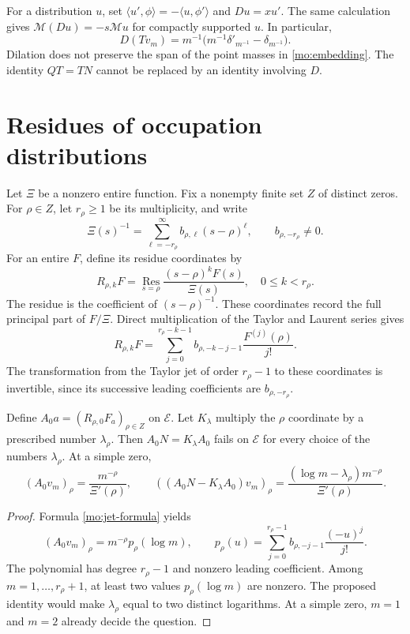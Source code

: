 For a distribution $u$, set $\langle u',\phi\rangle=-\langle
u,\phi'\rangle$ and $Du=xu'$. The same calculation gives
$\mathcal M(Du)=-s\mathcal Mu$ for compactly supported $u$.
In particular,
\[
 D(Tv_m)=m^{-1}\bigl(m^{-1}\delta'_{m^{-1}}-\delta_{m^{-1}}\bigr).
\]
Dilation does not preserve the span of the point masses in
\eqref{mo:embedding}. The identity $QT=TN$ cannot be replaced by
an identity involving $D$.

\section{Residues of occupation distributions}

Let $\Xi$ be a nonzero entire function. Fix a nonempty finite set
$Z$ of distinct zeros. For $\rho\in Z$, let $r_\rho\geq1$ be its
multiplicity, and write
\[
 \Xi(s)^{-1}=
 \sum_{\ell=-r_\rho}^{\infty}b_{\rho,\ell}(s-\rho)^\ell,
 \qquad b_{\rho,-r_\rho}\ne0.
\]
For an entire $F$, define its residue coordinates by
\begin{equation}
 R_{\rho,k}F=\operatorname*{Res}_{s=\rho}
 \frac{(s-\rho)^kF(s)}{\Xi(s)},
 \quad 0\leq k<r_\rho.
 \label{mo:jets}
\end{equation}
The residue is the coefficient of $(s-\rho)^{-1}$. These coordinates
record the full principal part of $F/\Xi$. Direct multiplication
of the Taylor and Laurent series gives
\begin{equation}
 R_{\rho,k}F=
 \sum_{j=0}^{r_\rho-k-1}
 b_{\rho,-k-j-1}\frac{F^{(j)}(\rho)}{j!}.
 \label{mo:jet-formula}
\end{equation}
The transformation from the Taylor jet of order $r_\rho-1$ to
these coordinates is invertible, since its successive leading
coefficients are $b_{\rho,-r_\rho}$.

\begin{proposition}
\label{mo:occupation-defect}
Define $A_0a=(R_{\rho,0}F_a)_{\rho\in Z}$ on $\mathscr E$.
Let $K_\lambda$ multiply the $\rho$ coordinate by a prescribed
number $\lambda_\rho$. Then $A_0N=K_\lambda A_0$ fails on
$\mathscr E$ for every choice of the numbers $\lambda_\rho$.
At a simple zero,
\begin{equation}
 (A_0v_m)_\rho=\frac{m^{-\rho}}{\Xi'(\rho)},\qquad
 ((A_0N-K_\lambda A_0)v_m)_\rho
 =\frac{(\log m-\lambda_\rho)m^{-\rho}}{\Xi'(\rho)}.
 \label{mo:simple-occupation}
\end{equation}
\end{proposition}
\begin{proof}
Formula \eqref{mo:jet-formula} yields
\[
 (A_0v_m)_\rho=m^{-\rho}p_\rho(\log m),\qquad
 p_\rho(u)=\sum_{j=0}^{r_\rho-1}
 b_{\rho,-j-1}\frac{(-u)^j}{j!}.
\]
The polynomial has degree $r_\rho-1$ and nonzero leading
coefficient. Among $m=1,\ldots,r_\rho+1$, at least two values
$p_\rho(\log m)$ are nonzero. The proposed identity would make
$\lambda_\rho$ equal to two distinct logarithms. At a simple zero,
$m=1$ and $m=2$ already decide the question.
\end{proof}

